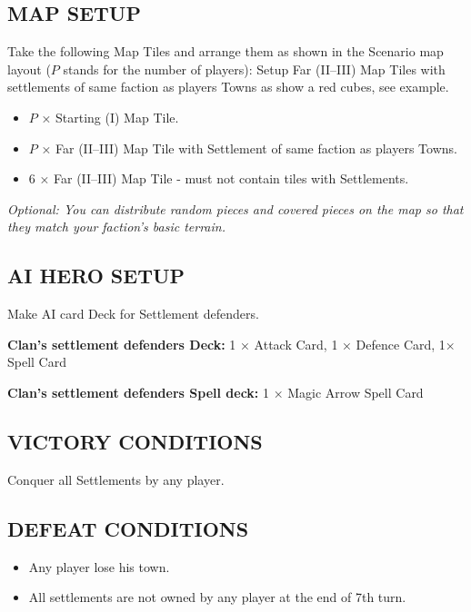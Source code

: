 \begin{multicols*}{2}
\subsection*{\MakeUppercase{Map Setup}}

Take the following Map Tiles and arrange them as shown in the Scenario map layout ($P$ stands for the number of players):
Setup Far (II--III) Map Tiles with settlements of same faction as players Towns as show a red cubes, see example.

\begin{itemize}
  \item $P$ × Starting (I) Map Tile.
  \item $P$ × Far (II--III) Map Tile with Settlement of same faction as players Towns.
  \item 6 × Far (II--III) Map Tile - must not contain tiles with Settlements.
\end{itemize}

\textit{Optional: You can distribute random pieces and covered pieces on the map so that they match your faction's basic terrain.}

\subsection*{\MakeUppercase{AI Hero Setup}}

Make AI card Deck for Settlement defenders.

\textbf{Clan's settlement defenders Deck:} 1 × Attack Card, 1 × Defence Card, 1× Spell Card

\textbf{Clan's settlement defenders Spell deck:} 1 × Magic Arrow Spell Card


\subsection*{\MakeUppercase{Victory Conditions}}
Conquer all Settlements by any player.

\subsection*{\MakeUppercase{Defeat Conditions}}

\begin{itemize}
  \item Any player lose his town.
  \item All settlements are not owned by any player at the end of 7th turn.
\end{itemize}


\end{multicols*}
